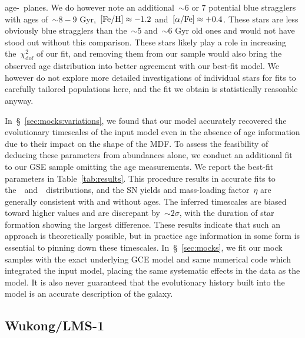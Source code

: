 age-\afe~planes.
We do however note an additional~$\sim$6 or 7 potential blue stragglers with
ages of~$\sim$$8 - 9$ Gyr,~$\text{[Fe/H]} \approx -1.2$ and~$\text{[$\alpha$/Fe]} \approx +0.4$.
These stars are less obviously blue stragglers than the~$\sim$5 and~$\sim$6 Gyr
old ones and would not have stood out without this comparison.
These stars likely play a role in increasing the~$\chi_\text{dof}^2$ of our
fit, and removing them from our sample would also bring the observed age
distribution into better agreement with our best-fit model.
We however do not explore more detailed investigations of individual stars for
fits to carefully tailored populations here, and the fit we obtain is
statistically reasonble anyway.
\par
In~\S~\ref{sec:mocks:variations}, we found that our model accurately recovered
the evolutionary timescales of the input model even in the absence of age
information due to their impact on the shape of the MDF.
To assess the feasibility of deducing these parameters from abundances alone,
we conduct an additional fit to our GSE sample omitting the age measurements.
We report the best-fit parameters in Table~\ref{tab:results}.
This procedure results in accurate fits to the~\feh~and~\afe~distributions, and
the SN yields and mass-loading factor~$\eta$ are generally consistent with
and without ages.
The inferred timescales are biased toward higher values and are discrepant
by~$\sim$$2\sigma$, with the duration of star formation showing the largest
difference.
These results indicate that such an approach is theoretically possible, but in
practice age information in some form is essential to pinning down these
timescales.
In~\S~\ref{sec:mocks}, we fit our mock samples with the exact underlying GCE
model and same numerical code which integrated the input model, placing the
same systematic effects in the data as the model.
It is also never guaranteed that the evolutionary history built into the model
is an accurate description of the galaxy.

\subsection{Wukong/LMS-1}
\label{sec:h3:wukong}

